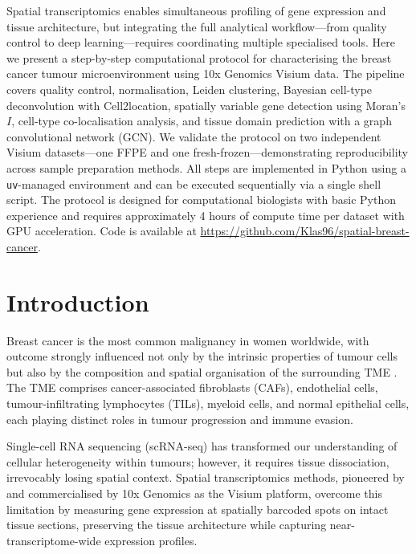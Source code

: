\documentclass[12pt, a4paper]{article}
\begin{document}
Spatial transcriptomics enables simultaneous profiling of gene expression and tissue architecture, but integrating the full analytical workflow---from quality control to deep learning---requires coordinating multiple specialised tools. Here we present a step-by-step computational protocol for characterising the breast cancer tumour microenvironment using 10x Genomics Visium data. The pipeline covers quality control, normalisation, Leiden clustering, Bayesian cell-type deconvolution with Cell2location, spatially variable gene detection using Moran's $I$, cell-type co-localisation analysis, and tissue domain prediction with a graph convolutional network (GCN). We validate the protocol on two independent Visium datasets---one FFPE and one fresh-frozen---demonstrating reproducibility across sample preparation methods. All steps are implemented in Python using a \texttt{uv}-managed environment and can be executed sequentially via a single shell script. The protocol is designed for computational biologists with basic Python experience and requires approximately 4 hours of compute time per dataset with GPU acceleration. Code is available at \url{https://github.com/Klas96/spatial-breast-cancer}.

\section{Introduction}

Breast cancer is the most common malignancy in women worldwide, with outcome strongly influenced not only by the intrinsic properties of tumour cells but also by the composition and spatial organisation of the surrounding TME \citep{wu2021}. The TME comprises cancer-associated fibroblasts (CAFs), endothelial cells, tumour-infiltrating lymphocytes (TILs), myeloid cells, and normal epithelial cells, each playing distinct roles in tumour progression and immune evasion.

Single-cell RNA sequencing (scRNA-seq) has transformed our understanding of cellular heterogeneity within tumours; however, it requires tissue dissociation, irrevocably losing spatial context. Spatial transcriptomics methods, pioneered by \citet{stahl2016} and commercialised by 10x Genomics as the Visium platform, overcome this limitation by measuring gene expression at spatially barcoded spots on intact tissue sections, preserving the tissue architecture while capturing near-transcriptome-wide expression profiles.
\end{document}
